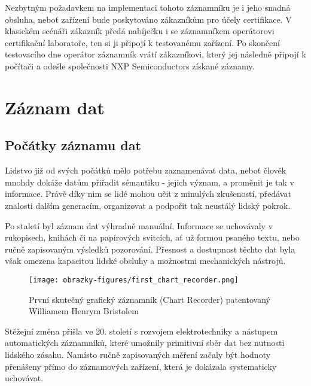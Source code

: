 Nezbytným požadavkem na implementaci tohoto záznamníku je i jeho snadná obsluha, neboť zařízení bude poskytováno zákazníkům pro 
účely certifikace. V klasickém scénáři zákazník předá nabíječku i se záznamníkem operátorovi certifikační laboratoře, ten si ji 
připojí k testovanému zařízení. Po skončení testovacího dne operátor záznamník vrátí zákazníkovi, který jej následně připojí k 
počítači a odešle společnosti NXP Semiconductors získané záznamy.


\chapter{Záznam dat}
\label{zaznam_dat}

\section{Počátky záznamu dat}
\label{pocatky}
Lidstvo již od svých počátků mělo potřebu zaznamenávat data, neboť člověk mnohdy dokáže datům přiřadit sémantiku - jejich význam, 
a proměnit je tak v informace. Právě díky nim se lidé mohou učit z minulých zkušeností, předávat znalosti dalším generacím, 
organizovat a podpořit tak neustálý lidský pokrok. 

Po staletí byl záznam dat výhradně manuální. Informace se uchovávaly v rukopisech, knihách či na papírových svitcích, ať už formou 
psaného textu, nebo ručně zapisovaným výsledků pozorování. Přesnost a dostupnost těchto dat byla však omezena kapacitou lidské 
obsluhy a možnostmi mechanických nástrojů.

\begin{figure}[h] %
    \centering
    \texttt{[image: obrazky-figures/first\_chart\_recorder.png]}
    \caption{První skutečný grafický záznamník (Chart Recorder) patentovaný Williamem Henrym Bristolem \cite{bristol_chart_recorders}}
    \label{fig:chart_recorder}
\end{figure}

Stěžejní změna přišla ve 20. století s rozvojem elektrotechniky a nástupem automatických záznamníků, které umožnily primitivní 
sběr dat bez nutnosti lidského zásahu. Namísto ručně zapisovaných měření začaly být hodnoty přenášeny přímo do záznamových 
zařízení, která je dokázala systematicky uchovávat. \cite{origin_of_chart_recorders}

